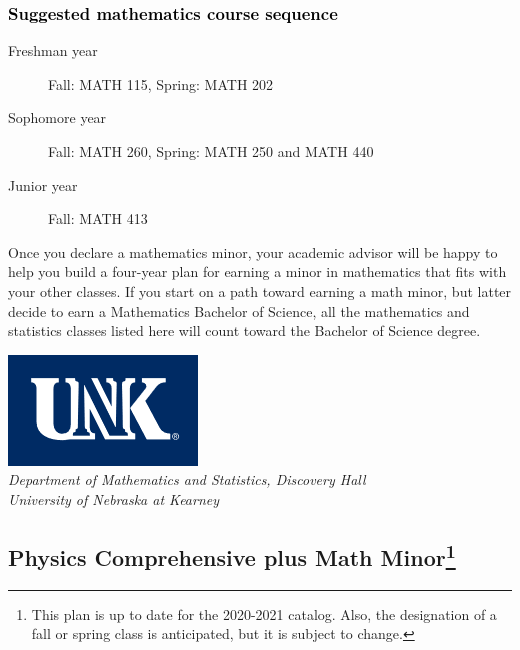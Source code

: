 \documentclass[10pt]{article}
\begin{document}
\vspace{-0.1in}
\subsubsection*{\textcolor{black}{Suggested mathematics course sequence}}

\begin{description}
   \item[\phantom{xxx} Freshman year] Fall: MATH 115, Spring:  MATH 202
      \item[\phantom{xxx} Sophomore year]  Fall: MATH 260,  Spring: MATH 250  and MATH 440
     \item[\phantom{xxx} Junior year]  Fall: MATH 413
 \end{description}
Once you declare a mathematics minor, your academic advisor will be happy to help you build a four-year plan for earning a minor in mathematics that fits with your other classes.  If you start on a path toward earning a math minor, but latter decide to earn a  Mathematics Bachelor of Science, all the mathematics and statistics  classes listed here will count toward the Bachelor of Science degree.




\newpage


\begin{flushleft}
\includegraphics[scale=0.25]{unk-logo}\\
 \emph{\textcolor{unkblue}{Department of Mathematics and Statistics, Discovery Hall}} \\
  \emph{\textcolor{unkblue}{University of Nebraska at Kearney}}
\end{flushleft}

\subsection*{\textbf{\textcolor{unkblue}{Physics Comprehensive plus Math Minor\footnote[1]{This plan is up to date for the 2020-2021 catalog. Also, the designation of a fall or spring class is anticipated, but it is subject to change.
}}}}
\end{document}
